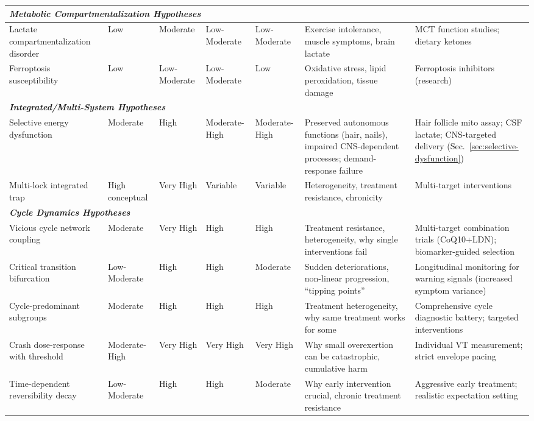 \begin{landscape}
\begin{longtable}{p{3.5cm}p{2cm}p{2cm}p{1.8cm}p{1.8cm}p{4.5cm}p{5cm}}
\midrule
\multicolumn{7}{l}{\textit{\textbf{Metabolic Compartmentalization Hypotheses}}} \\
\midrule
Lactate compartmentalization disorder & Low & Moderate & Low-Moderate & Low-Moderate & Exercise intolerance, muscle symptoms, brain lactate & MCT function studies; dietary ketones \\
\midrule
Ferroptosis susceptibility & Low & Low-Moderate & Low-Moderate & Low & Oxidative stress, lipid peroxidation, tissue damage & Ferroptosis inhibitors (research) \\
\midrule
\multicolumn{7}{l}{\textit{\textbf{Integrated/Multi-System Hypotheses}}} \\
\midrule
Selective energy dysfunction & Moderate & High & Moderate-High & Moderate-High & Preserved autonomous functions (hair, nails), impaired CNS-dependent processes; demand-response failure & Hair follicle mito assay; CSF lactate; CNS-targeted delivery (Sec.~\ref{sec:selective-dysfunction}) \\
\midrule
Multi-lock integrated trap & High conceptual & Very High & Variable & Variable & Heterogeneity, treatment resistance, chronicity & Multi-target interventions \\
\midrule
\multicolumn{7}{l}{\textit{\textbf{Cycle Dynamics Hypotheses}}} \\
\midrule
Vicious cycle network coupling & Moderate & Very High & High & High & Treatment resistance, heterogeneity, why single interventions fail & Multi-target combination trials (CoQ10+LDN); biomarker-guided selection \\
\midrule
Critical transition bifurcation & Low-Moderate & High & High & Moderate & Sudden deteriorations, non-linear progression, ``tipping points'' & Longitudinal monitoring for warning signals (increased symptom variance) \\
\midrule
Cycle-predominant subgroups & Moderate & High & High & High & Treatment heterogeneity, why same treatment works for some & Comprehensive cycle diagnostic battery; targeted interventions \\
\midrule
Crash dose-response with threshold & Moderate-High & Very High & Very High & Very High & Why small overexertion can be catastrophic, cumulative harm & Individual VT measurement; strict envelope pacing \\
\midrule
Time-dependent reversibility decay & Low-Moderate & High & High & Moderate & Why early intervention crucial, chronic treatment resistance & Aggressive early treatment; realistic expectation setting \\

\end{longtable}
\end{landscape}
